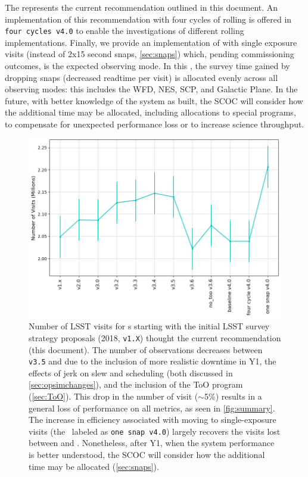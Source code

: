  The  represents the current recommendation outlined in this document. An implementation of this recommendation with four cycles of rolling is offered in \texttt{four cycles v4.0} to enable the investigations of different rolling implementations. Finally, we provide an implementation of  with single exposure visits (instead of 2x15 second snaps, \autoref{sec:snaps}) which, pending commissioning outcomes, is the expected observing mode. In this \opsim, the survey time gained by dropping snaps (decreased readtime per visit) is allocated evenly across all observing modes: this includes the WFD, NES, SCP, and Galactic Plane. In the future, with better knowledge of the system as built, the SCOC will consider how the additional time may be allocated, including allocations to special programs,  to compensate for unexpected performance loss or to increase science throughput.
\begin{figure}
    \centering
    \includegraphics[width=0.9\linewidth]{figures/total_nvisits.png}
    \caption{Number of LSST visits for \opsim s starting with the initial LSST survey strategy proposals (2018, \texttt{v1.X}) thought the current recommendation (this document). The number of observations decreases between \texttt{v3.5} and  due to the inclusion of more realistic downtime in Y1, the effects of jerk on slew and scheduling (both discussed in \autoref{sec:opsimchanges}), and the inclusion of the ToO program (\autoref{sec:ToO}). This drop in the number of visit (\mbox{$\sim$5\%}) results in a general loss of performance on all metrics, as seen in \autoref{fig:summary}. The increase in efficiency associated with moving to single-exposure visits (the \opsim\ labeled as \texttt{one snap v4.0}) largely recovers the visits lost between  and . Nonetheless, after Y1, when the system performance is better understood, the SCOC will consider how the additional time may be allocated (\autoref{sec:snaps}). }
    \label{fig:nvisits}
\end{figure}

